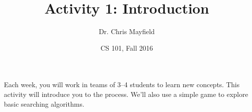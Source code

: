 \documentclass[12pt]{article}
\title{Activity 1: Introduction}
\author{Dr. Chris Mayfield}
\date{CS 101, Fall 2016}
\begin{document}
\maketitle

Each week, you will work in teams of 3--4 students to learn new concepts.
This activity will introduce you to the process.
We'll also use a simple game to explore basic searching algorithms.



\end{document}
